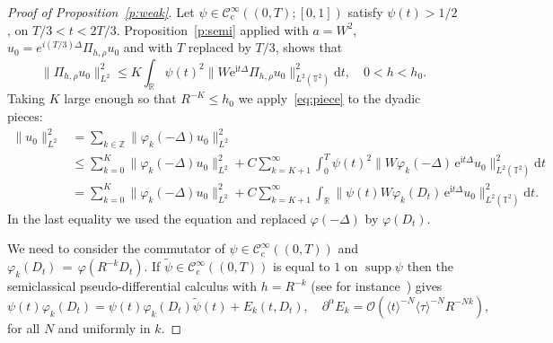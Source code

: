 \documentclass[AHL, Unicode, longabstracts]{cedram}
\DeclareMathOperator{\supp}{supp}
\newcommand{\CIc}{{\mathcal C}^\infty_{\mathrm{c}} }
\newcommand{\R}{{\mathbb R}}
\newcommand{\TT}{{\mathbb T}}
\newcommand{\ZZ}{{\mathbb Z}}
\newcommand{\TT}{{\mathbb T}}
\newcommand{\R}{{\mathbb R}}
\newcommand{\ZZ}{{\mathbb Z}}
\newcommand*{\dd}{\mathrm{d}}
\newcommand*{\dt}{\dd t}
\begin{document}
\begin{proof}[Proof of Proposition~\ref{p:weak}]
Let $\psi \in \CIc ((0, T) ; [0, 1]) $ satisfy $\psi (t) > 1/2$, on $ T/3 < t < 2T / 3 $. Proposition~\ref{p:semi} applied with $ a = W^2 $, $ u_0 = e^{ i (T/3) \Delta } \Pi_{h, \rho } u_0 $ and with $ T $ replaced by $ T/3 $, shows that
\begin{equation}\label{eq:piece}
\|\Pi_{h, \rho } u_0\|_{L^2}^2 \leq K \int_\R \psi(t)^2 \| W \mathrm{e}^{\mathrm{i} t \Delta } \Pi_{h, \rho } u_0\|_{L^2 (\TT^2) }^2 \dt, \quad 0 < h < h_0.
\end{equation}
Taking $K $ large enough so that $R^{-K } \leq h_{0}$ we apply~\eqref{eq:piece} to the dyadic pieces:
\begin{align*}
\|u_0 \|^2_{L^2} & =\sum_{ k \in \ZZ } \|\varphi_{k}(-\Delta)u_0\|_{L^2}^2 \\
&\leq \sum_{k=0}^{K } \|\varphi_{k}(-\Delta)u_0\|_{L^2}^2 +C
\sum_{k=K +1}^\infty \int_{0}^T \psi (t) ^2 \| W \varphi_{k}(-\Delta)\,
\mathrm{e}^{\mathrm{i}t \Delta } u_0\|_{L^2(\TT^2) } ^2 \dt \\
& = \sum_{k=0}^{K } \|\varphi_{k}(-\Delta)u_0\|_{L^2}^2 + C
\sum_{k=K +1}^\infty \int_\R \| \psi (t) W \varphi_{k}(D_t)
\,\mathrm{e}^{\mathrm{i}t \Delta } u_0\|_{L^2(\TT^2) } ^2 \dt.
\end{align*}
In the last equality we used the equation and replaced $ \varphi (-\Delta) $ by $
\varphi (D_t) $.

We need to consider the commutator of $ \psi \in \CIc ((0, T)) $ and $
\varphi_{k} (D_t)\,{=}\,\varphi (R^{-k} D_t) $. If $
\widetilde \psi \in \CIc ((0,T))$ is equal to $ 1 $ on $
\supp \psi$ then the semiclassical pseudo-differential calculus with $ h = R ^{-k}$ (see for instance~\cite[Chapter~4]{EZB}) gives
\begin{equation}\label{eq:wideps}
\psi (t) \varphi_{k} (D_t) = \psi (t) \varphi_{k} (D_t) \widetilde \psi (t) + E _k (t, D_t),\quad
\partial^\alpha E_k = {\mathcal O} (\langle t \rangle^{-N } \langle
\tau \rangle^{-N} R ^{- N k }),
\end{equation}
for all $ N$ and uniformly in $ k $.


\end{proof}
\end{document}
